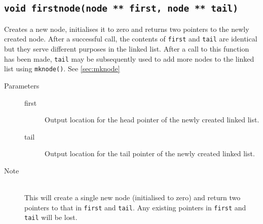 \documentclass{article}
\begin{document}
\subsection{\lstinline{void firstnode(node ** first, node ** tail)}} \label{sec:firstnode}
Creates a new node, initialises it to zero and returns two pointers to the newly created node. After a successful call, the contents of \lstinline{first} and \lstinline{tail} are identical but they serve different purposes in the linked list. After a call to this function has been made, \lstinline{tail} may be subsequently used to add more nodes to the linked list using \lstinline{mknode()}. See \ref{sec:mknode}
\begin{description}
	\item[Parameters]\hfill
	\begin{description}
		\item[first] Output location for the head pointer of the newly created linked list.
		\item[tail] Output location for the tail pointer of the newly created linked list.
	\end{description}
	\item[Note]\hfill\\
		This will create a single new node (initialised to zero) and return two pointers to that in \lstinline{first} and \lstinline{tail}. Any existing pointers in \lstinline{first} and \lstinline{tail} will be lost.
\end{description}
\end{document}
